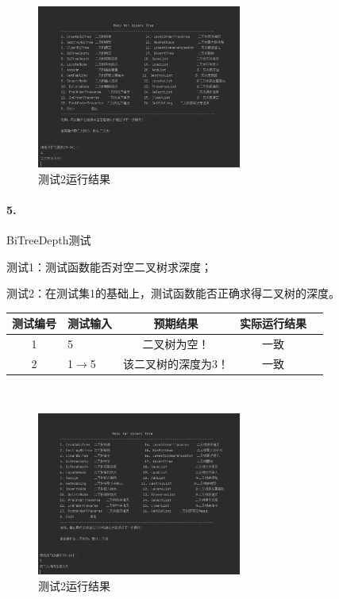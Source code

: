 \documentclass[supercite]{Experimental_Report}
\theoremstyle{definition}
\begin{document}
~\

\begin{figure}[H]
 	\centering
 	\includegraphics[width=0.6\textwidth]{images/二叉树测试4.png}
 	\caption{测试2运行结果}
 	\label{txlab}
 \end{figure}

\paragraph{ 5.}BiTreeDepth测试

测试1：测试函数能否对空二叉树求深度；

测试2：在测试集1的基础上，测试函数能否正确求得二叉树的深度。

\vspace{0.5em}

\begin{tabular}{|c|l|c|c|c|}
	\hline
	测试编号 & 测试输入 & 预期结果 & 实际运行结果 \\
	\hline
	1 & 5 & 二叉树为空！ & 一致 \\
	\hline
	2 & 1$\rightarrow$5 & 该二叉树的深度为3！ & 一致 \\
	\hline
\end{tabular}

~\

\begin{figure}[H]
 	\centering
 	\includegraphics[width=0.6\textwidth]{images/二叉树测试5.png}
 	\caption{测试2运行结果}
 	\label{txlab}
 \end{figure}
\end{document}
